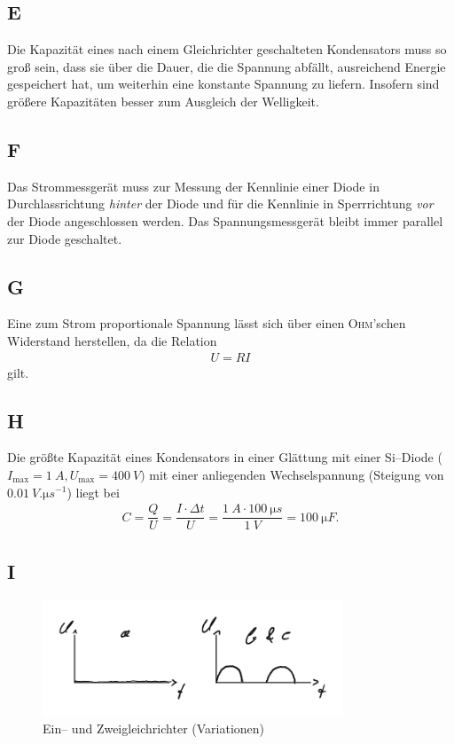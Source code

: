 \documentclass[a4paper,10pt]{article}
\numberwithin{equation}{section}
\begin{document}
\subsection{E}
Die Kapazität eines nach einem Gleichrichter geschalteten Kondensators muss so groß sein, dass sie über die Dauer, die die Spannung abfällt, ausreichend Energie gespeichert hat, um weiterhin eine konstante Spannung zu liefern.
Insofern sind größere Kapazitäten besser zum Ausgleich der Welligkeit.

\subsection{F}
Das Strommessgerät muss zur Messung der Kennlinie einer Diode in Durchlassrichtung \textit{hinter} der Diode und für die Kennlinie in Sperrrichtung \textit{vor} der Diode angeschlossen werden.
Das Spannungsmessgerät bleibt immer parallel zur Diode geschaltet.

\subsection{G}
Eine zum Strom proportionale Spannung lässt sich über einen \textsc{Ohm}'schen Widerstand herstellen, da die Relation
\begin{align} 
        U=RI
\end{align} 
gilt.

\subsection{H}
Die größte Kapazität eines Kondensators in einer Glättung mit einer Si--Diode ($I_{\text{max}}=\SI{1}{A}, U_{\text{max}}=\SI{400}{V})$ mit einer anliegenden Wechselspannung (Steigung von $\SI{0.01}{V.\micro s ^{-1}}$) liegt bei
\begin{align} 
        C=\dfrac{Q}{U}=\dfrac{I\cdot \Delta t}{U}=\dfrac{\SI{1}{A}\cdot \SI{100}{\micro s}}{\SI{1}{V}}=\SI{100}{\micro F}
.\end{align} 

\subsection{I}
\begin{figure}[h]
        \centering
        \includegraphics[width=0.8\textwidth]{I_crop.pdf}
        \caption[Ein-- und Zweigleichrichter (Variationen)]{Ein-- und Zweigleichrichter (Variationen)}
\end{figure}
\end{document}
